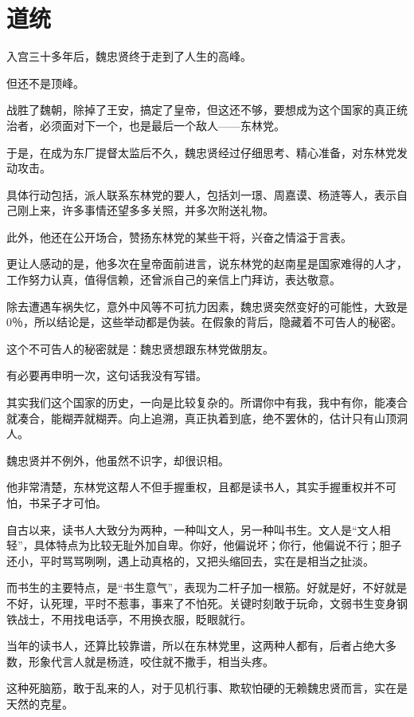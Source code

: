 \section{道统}
\ifnum{}
	\begin{multicols}{\theparacolNo}
\fi
入宫三十多年后，魏忠贤终于走到了人生的高峰。

但还不是顶峰。

战胜了魏朝，除掉了王安，搞定了皇帝，但这还不够，要想成为这个国家的真正统治者，必须面对下一个，也是最后一个敌人——东林党。

于是，在成为东厂提督太监后不久，魏忠贤经过仔细思考、精心准备，对东林党发动攻击。

具体行动包括，派人联系东林党的要人，包括刘一璟、周嘉谟、杨涟等人，表示自己刚上来，许多事情还望多多关照，并多次附送礼物。

此外，他还在公开场合，赞扬东林党的某些干将，兴奋之情溢于言表。

更让人感动的是，他多次在皇帝面前进言，说东林党的赵南星是国家难得的人才，工作努力认真，值得信赖，还曾派自己的亲信上门拜访，表达敬意。

除去遭遇车祸失忆，意外中风等不可抗力因素，魏忠贤突然变好的可能性，大致是0％，所以结论是，这些举动都是伪装。在假象的背后，隐藏着不可告人的秘密。

这个不可告人的秘密就是：魏忠贤想跟东林党做朋友。

有必要再申明一次，这句话我没有写错。

其实我们这个国家的历史，一向是比较复杂的。所谓你中有我，我中有你，能凑合就凑合，能糊弄就糊弄。向上追溯，真正执着到底，绝不罢休的，估计只有山顶洞人。

魏忠贤并不例外，他虽然不识字，却很识相。

他非常清楚，东林党这帮人不但手握重权，且都是读书人，其实手握重权并不可怕，书呆子才可怕。

自古以来，读书人大致分为两种，一种叫文人，另一种叫书生。文人是“文人相轻”，具体特点为比较无耻外加自卑。你好，他偏说坏；你行，他偏说不行；胆子还小，平时骂骂咧咧，遇上动真格的，又把头缩回去，实在是相当之扯淡。

而书生的主要特点，是“书生意气”，表现为二杆子加一根筋。好就是好，不好就是不好，认死理，平时不惹事，事来了不怕死。关键时刻敢于玩命，文弱书生变身钢铁战士，不用找电话亭，不用换衣服，眨眼就行。

当年的读书人，还算比较靠谱，所以在东林党里，这两种人都有，后者占绝大多数，形象代言人就是杨涟，咬住就不撒手，相当头疼。

这种死脑筋，敢于乱来的人，对于见机行事、欺软怕硬的无赖魏忠贤而言，实在是天然的克星。


\end{multicols}
